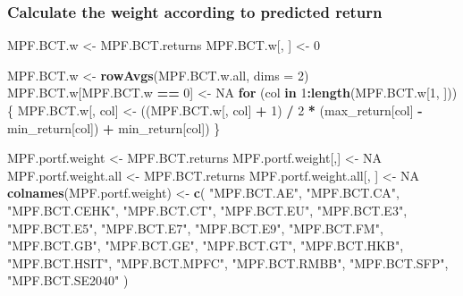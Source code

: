 \documentclass[
]{article}
\newenvironment{Shaded}{\begin{snugshade}}{\end{snugshade}}
\newcommand{\ControlFlowTok}[1]{\textcolor[rgb]{0.13,0.29,0.53}{\textbf{#1}}}
\newcommand{\DataTypeTok}[1]{\textcolor[rgb]{0.13,0.29,0.53}{#1}}
\newcommand{\DecValTok}[1]{\textcolor[rgb]{0.00,0.00,0.81}{#1}}
\newcommand{\KeywordTok}[1]{\textcolor[rgb]{0.13,0.29,0.53}{\textbf{#1}}}
\newcommand{\NormalTok}[1]{#1}
\newcommand{\OperatorTok}[1]{\textcolor[rgb]{0.81,0.36,0.00}{\textbf{#1}}}
\newcommand{\OtherTok}[1]{\textcolor[rgb]{0.56,0.35,0.01}{#1}}
\newcommand{\StringTok}[1]{\textcolor[rgb]{0.31,0.60,0.02}{#1}}
\begin{document}
\hypertarget{calculate-the-weight-according-to-predicted-return}{%
\subsubsection{Calculate the weight according to predicted
return}\label{calculate-the-weight-according-to-predicted-return}}

\begin{Shaded}
\begin{Highlighting}[]
\NormalTok{MPF.BCT.w <-}\StringTok{ }\NormalTok{MPF.BCT.returns}
\NormalTok{MPF.BCT.w[, ] <-}\StringTok{ }\DecValTok{0}

\NormalTok{MPF.BCT.w <-}\StringTok{ }\KeywordTok{rowAvgs}\NormalTok{(MPF.BCT.w.all, }\DataTypeTok{dims =} \DecValTok{2}\NormalTok{)}
\NormalTok{MPF.BCT.w[MPF.BCT.w }\OperatorTok{==}\StringTok{ }\DecValTok{0}\NormalTok{] <-}\StringTok{ }\OtherTok{NA}
\ControlFlowTok{for}\NormalTok{ (col }\ControlFlowTok{in} \DecValTok{1}\OperatorTok{:}\KeywordTok{length}\NormalTok{(MPF.BCT.w[}\DecValTok{1}\NormalTok{, ])) \{}
\NormalTok{  MPF.BCT.w[, col] <-}
\StringTok{    }\NormalTok{((MPF.BCT.w[, col] }\OperatorTok{+}\StringTok{ }\DecValTok{1}\NormalTok{) }\OperatorTok{/}\StringTok{ }\DecValTok{2} \OperatorTok{*}\StringTok{ }\NormalTok{(max_return[col] }\OperatorTok{-}\StringTok{ }\NormalTok{min_return[col]) }\OperatorTok{+}\StringTok{ }\NormalTok{min_return[col])}
\NormalTok{\}}



\NormalTok{MPF.portf.weight <-}\StringTok{ }\NormalTok{MPF.BCT.returns}
\NormalTok{MPF.portf.weight[,] <-}\StringTok{ }\OtherTok{NA}
\NormalTok{MPF.portf.weight.all <-}\StringTok{ }\NormalTok{MPF.BCT.returns}
\NormalTok{MPF.portf.weight.all[, ] <-}\StringTok{ }\OtherTok{NA}
\KeywordTok{colnames}\NormalTok{(MPF.portf.weight) <-}
\StringTok{  }\KeywordTok{c}\NormalTok{(}
    \StringTok{"MPF.BCT.AE"}\NormalTok{,}
    \StringTok{"MPF.BCT.CA"}\NormalTok{,}
    \StringTok{"MPF.BCT.CEHK"}\NormalTok{,}
    \StringTok{"MPF.BCT.CT"}\NormalTok{,}
    \StringTok{"MPF.BCT.EU"}\NormalTok{,}
    \StringTok{"MPF.BCT.E3"}\NormalTok{,}
    \StringTok{"MPF.BCT.E5"}\NormalTok{,}
    \StringTok{"MPF.BCT.E7"}\NormalTok{,}
    \StringTok{"MPF.BCT.E9"}\NormalTok{,}
    \StringTok{"MPF.BCT.FM"}\NormalTok{,}
    \StringTok{"MPF.BCT.GB"}\NormalTok{,}
    \StringTok{"MPF.BCT.GE"}\NormalTok{,}
    \StringTok{"MPF.BCT.GT"}\NormalTok{,}
    \StringTok{"MPF.BCT.HKB"}\NormalTok{,}
    \StringTok{"MPF.BCT.HSIT"}\NormalTok{,}
    \StringTok{"MPF.BCT.MPFC"}\NormalTok{,}
    \StringTok{"MPF.BCT.RMBB"}\NormalTok{,}
    \StringTok{"MPF.BCT.SFP"}\NormalTok{,}
    \StringTok{"MPF.BCT.SE2040"}
\NormalTok{  )}



\end{Highlighting}
\end{Shaded}
\end{document}
